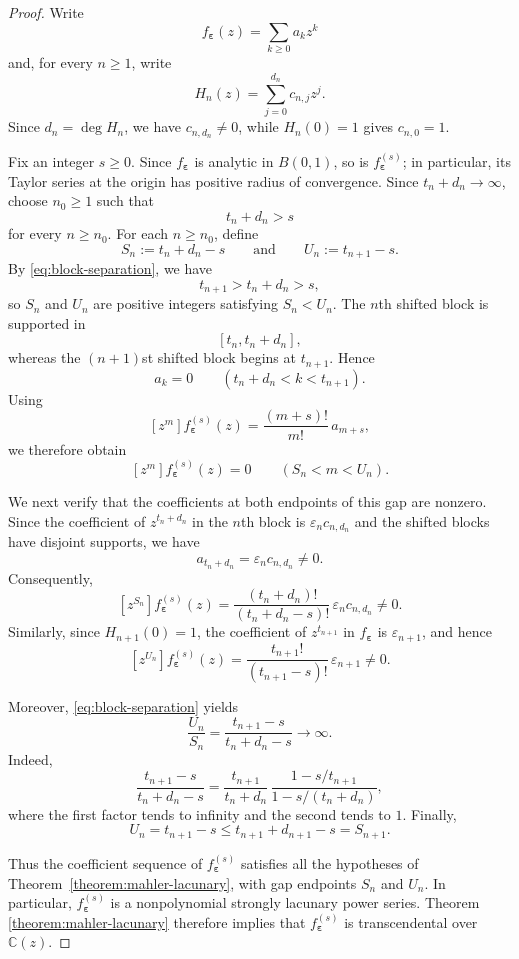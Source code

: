\documentclass[10pt]{amsart}
\theoremstyle{definition}
\theoremstyle{remark}
\numberwithin{equation}{section}
\newcommand{\C}{\mathbb C}
\begin{document}
\begin{proof}
Write
\[
f_{\boldsymbol{\varepsilon}}(z)
=
\sum_{k\geq 0}a_kz^k
\]
and, for every $n\geq 1$, write
\[
H_n(z)
=
\sum_{j=0}^{d_n}c_{n,j}z^j.
\]
Since $d_n=\deg H_n$, we have $c_{n,d_n}\neq 0$, while
$H_n(0)=1$ gives $c_{n,0}=1$.

Fix an integer $s\geq 0$. Since $f_{\boldsymbol{\varepsilon}}$ is
analytic in $B(0,1)$, so is $f_{\boldsymbol{\varepsilon}}^{(s)}$; in
particular, its Taylor series at the origin has positive radius of
convergence. Since $t_n+d_n\to\infty$, choose $n_0\geq 1$ such that
\[
t_n+d_n>s
\]
for every $n\geq n_0$. For each $n\geq n_0$, define
\[
S_n:=t_n+d_n-s
\qquad\text{and}\qquad
U_n:=t_{n+1}-s.
\]
By \eqref{eq:block-separation}, we have
\[
t_{n+1}>t_n+d_n>s,
\]
so $S_n$ and $U_n$ are positive integers satisfying $S_n<U_n$. The $n$th shifted block is supported in
\[
[t_n,t_n+d_n],
\]
whereas the $(n+1)$st shifted block begins at $t_{n+1}$. Hence
\[
a_k=0
\qquad
(t_n+d_n<k<t_{n+1}).
\]
Using
\[
[z^m]f_{\boldsymbol{\varepsilon}}^{(s)}(z)
=
\frac{(m+s)!}{m!}\,a_{m+s},
\]
we therefore obtain
\[
[z^m]f_{\boldsymbol{\varepsilon}}^{(s)}(z)=0
\qquad
(S_n<m<U_n).
\]

We next verify that the coefficients at both endpoints of this gap are
nonzero. Since the coefficient of $z^{t_n+d_n}$ in the $n$th block is
$\varepsilon_n c_{n,d_n}$ and the shifted blocks have disjoint supports,
we have
\[
a_{t_n+d_n}
=
\varepsilon_n c_{n,d_n}
\neq 0.
\]
Consequently,
\[
[z^{S_n}]f_{\boldsymbol{\varepsilon}}^{(s)}(z)
=
\frac{(t_n+d_n)!}{(t_n+d_n-s)!}\,
\varepsilon_n c_{n,d_n}
\neq 0.
\]
Similarly, since $H_{n+1}(0)=1$, the coefficient of $z^{t_{n+1}}$ in
$f_{\boldsymbol{\varepsilon}}$ is $\varepsilon_{n+1}$, and hence
\[
[z^{U_n}]f_{\boldsymbol{\varepsilon}}^{(s)}(z)
=
\frac{t_{n+1}!}{(t_{n+1}-s)!}\,
\varepsilon_{n+1}
\neq 0.
\]

Moreover, \eqref{eq:block-separation} yields
\[
\frac{U_n}{S_n}
=
\frac{t_{n+1}-s}{t_n+d_n-s}
\longrightarrow\infty.
\]
Indeed,
\[
\frac{t_{n+1}-s}{t_n+d_n-s}
=
\frac{t_{n+1}}{t_n+d_n}
\,
\frac{1-s/t_{n+1}}{1-s/(t_n+d_n)},
\]
where the first factor tends to infinity and the second tends to $1$.
Finally,
\[
U_n
=
t_{n+1}-s
\leq
t_{n+1}+d_{n+1}-s
=
S_{n+1}.
\]

Thus the coefficient sequence of
$f_{\boldsymbol{\varepsilon}}^{(s)}$ satisfies all the hypotheses of
Theorem~\ref{theorem:mahler-lacunary}, with gap endpoints $S_n$ and
$U_n$. In particular, $f_{\boldsymbol{\varepsilon}}^{(s)}$ is a
nonpolynomial strongly lacunary power series. Theorem
\ref{theorem:mahler-lacunary} therefore implies that
$f_{\boldsymbol{\varepsilon}}^{(s)}$ is transcendental over $\C(z)$.
\end{proof}
\end{document}
